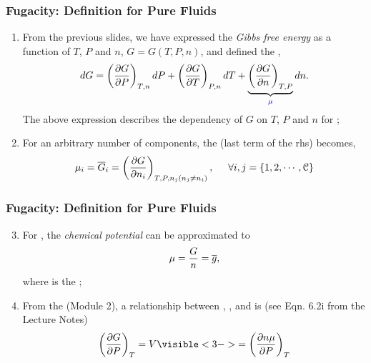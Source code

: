 \documentclass[10pt,compress,unknownkeysallowed]{beamer}
\begin{document}
\begin{frame}
  \frametitle{Fugacity: Definition for Pure Fluids}
        \begin{enumerate}%
           \item<1-> From the previous slides, we have expressed the {\it Gibbs free energy} as a function of $T$, $P$ and $n$, \ie $G=G(T,P,n)$, and defined the ,
              \begin{displaymath}
                dG = \Partial[G]{P}{T,n}dP + \Partial[G]{T}{P,n}dT + \underbrace{\Partial[G]{n}{T,P}}_{\blue{\mu}}dn.
              \end{displaymath}
              The above expression describes the dependency of $G$ on $T$, $P$ and $n$ for ;
           \item<2-> For an arbitrary number of components, the  (\ie last term of the rhs) becomes,
             \begin{displaymath}
               \mu_{i} = \overline{G}_{i}=\Partial[G]{n_{i}}{T,P,n_{j} \left(n_{j}\ne n_{i}\right)}, \hspace{0.5cm} \forall i,j=\left\{1,2,\cdots,\mathcal{C}\right\}
               \end{displaymath}
        \end{enumerate}
\end{frame}
\normalsize


\begin{frame}
  \frametitle{Fugacity: Definition for Pure Fluids}
        \begin{enumerate}\setcounter{enumi}{2}  
           \item<1-> For , the {\it chemical potential} can be approximated to
             \begin{displaymath}
               \mu = \frc{G}{n} = \overline{g},
             \end{displaymath}
             where  is the ;
             
           \item<2-> From the  (Module 2), a relationship between , ,  and  is (see Eqn. 6.2i from the Lecture Notes)
             \begin{displaymath}
                \Partial[G]{P}{T} = V \visible<3->{= \Partial[n\mu]{P}{T}}
             \end{displaymath}
               
        \end{enumerate}
\end{frame}
\normalsize
\end{document}

